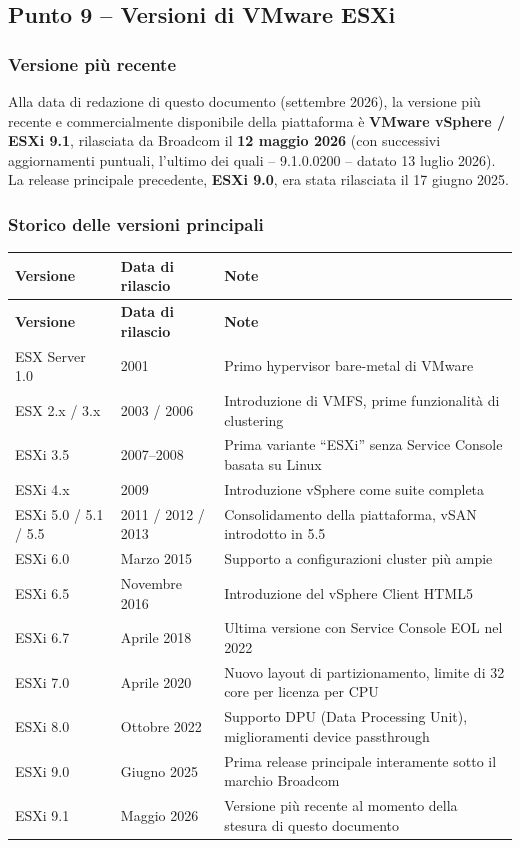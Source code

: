\documentclass[11pt,a4paper]{article}
\begin{document}
\subsection{Punto 9 -- Versioni di VMware ESXi}

\subsubsection{Versione più recente}

Alla data di redazione di questo documento (settembre 2026), la versione più recente e commercialmente disponibile della piattaforma è \textbf{VMware vSphere / ESXi 9.1}, rilasciata da Broadcom il \textbf{12 maggio 2026} (con successivi aggiornamenti puntuali, l'ultimo dei quali -- 9.1.0.0200 -- datato 13 luglio 2026). La release principale precedente, \textbf{ESXi 9.0}, era stata rilasciata il 17 giugno 2025.

\subsubsection{Storico delle versioni principali}

\begin{center}
\begin{longtable}{p{2.6cm}p{3.2cm}p{7.8cm}}
\toprule
\textbf{Versione} & \textbf{Data di rilascio} & \textbf{Note} \\
\midrule
\endfirsthead
\toprule
\textbf{Versione} & \textbf{Data di rilascio} & \textbf{Note} \\
\midrule
\endhead
ESX Server 1.0 & 2001 & Primo hypervisor bare-metal di VMware \\
ESX 2.x / 3.x & 2003 / 2006 & Introduzione di VMFS, prime funzionalità di clustering \\
ESXi 3.5 & 2007--2008 & Prima variante ``ESXi'' senza Service Console basata su Linux \\
ESXi 4.x & 2009 & Introduzione vSphere come suite completa \\
ESXi 5.0 / 5.1 / 5.5 & 2011 / 2012 / 2013 & Consolidamento della piattaforma, vSAN introdotto in 5.5 \\
ESXi 6.0 & Marzo 2015 & Supporto a configurazioni cluster più ampie \\
ESXi 6.5 & Novembre 2016 & Introduzione del vSphere Client HTML5 \\
ESXi 6.7 & Aprile 2018 & Ultima versione con Service Console EOL nel 2022 \\
ESXi 7.0 & Aprile 2020 & Nuovo layout di partizionamento, limite di 32 core per licenza per CPU \\
ESXi 8.0 & Ottobre 2022 & Supporto DPU (Data Processing Unit), miglioramenti device passthrough \\
ESXi 9.0 & Giugno 2025 & Prima release principale interamente sotto il marchio Broadcom \\
ESXi 9.1 & Maggio 2026 & Versione più recente al momento della stesura di questo documento \\
\bottomrule
\end{longtable}
\end{center}
\end{document}
